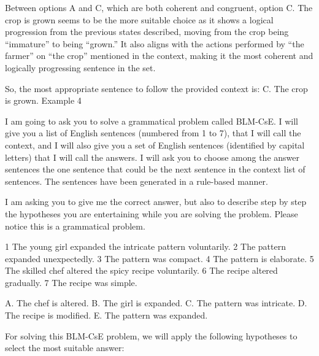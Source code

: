 Between options A and C, which are both coherent and congruent, option C. The crop is grown seems to be the more suitable choice as it shows a logical progression from the previous states described, moving from the crop being “immature” to being “grown.” It also aligns with the actions performed by “the farmer” on “the crop” mentioned in the context, making it the most coherent and logically progressing sentence in the set.

So, the most appropriate sentence to follow the provided context is:
C. The crop is grown.
Example 4 

I am going to ask you to solve a grammatical problem called BLM-CsE.  I will give you a list of English sentences (numbered from 1 to 7), that I will call the context, and I will also give you a set of English sentences (identified by capital letters) that I will call  the answers. I will ask you to choose among the answer sentences the one sentence that could be the next sentence in the context list of sentences. The sentences have been generated in a rule-based manner. 

I am asking you to give me the correct answer, but also to describe step by step  the hypotheses you are entertaining while you are solving the problem. Please notice this is a grammatical problem.

1 The young girl expanded the intricate pattern voluntarily.
2 The pattern expanded unexpectedly.
3 The pattern was compact.
4 The pattern is elaborate.
5 The skilled chef altered the spicy recipe voluntarily.
6 The recipe altered gradually.
7 The recipe was simple.

A. The chef is altered.
B. The girl is expanded.
C. The pattern was intricate.
D. The recipe is modified.
E. The pattern was expanded.


For solving this BLM-CsE problem, we will apply the following hypotheses to select the most suitable answer:

